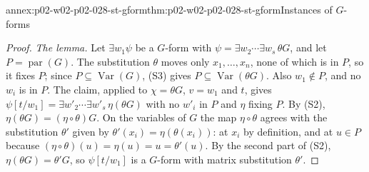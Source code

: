 \begin{annexitem}{annex:p02-w02-p02-028-st-gform}{thm:p02-w02-p02-028-st-gform}{Instances of \(G\)-forms}
\begin{proof}
\emph{The lemma.}  Let \(\exists w_1\psi\) be a \(G\)-form with
\(\psi=\exists w_2\cdots\exists w_s\,\theta G\), and let
\(P=\operatorname{par}(G)\).  The substitution \(\theta\) moves only
\(x_1,\ldots,x_n\), none of which is in \(P\), so it fixes \(P\); since
\(P\subseteq\operatorname{Var}(G)\), (S3) gives
\(P\subseteq\operatorname{Var}(\theta G)\).  Also \(w_1\notin P\), and no
\(w_i\) is in \(P\).  The claim, applied to \(\chi=\theta G\), \(v=w_1\) and
\(t\), gives
\(\psi[t/w_1]=\exists w'_2\cdots\exists w'_s\,\eta(\theta G)\) with no
\(w'_i\) in \(P\) and \(\eta\) fixing \(P\).  By (S2),
\(\eta(\theta G)=(\eta\circ\theta)G\).  On the variables of \(G\) the map
\(\eta\circ\theta\) agrees with the substitution \(\theta'\) given by
\(\theta'(x_i)=\eta(\theta(x_i))\): at \(x_i\) by definition, and at
\(u\in P\) because \((\eta\circ\theta)(u)=\eta(u)=u=\theta'(u)\).  By the
second part of (S2), \(\eta(\theta G)=\theta'G\), so \(\psi[t/w_1]\) is a
\(G\)-form with matrix substitution \(\theta'\).
\end{proof}
\end{annexitem}

